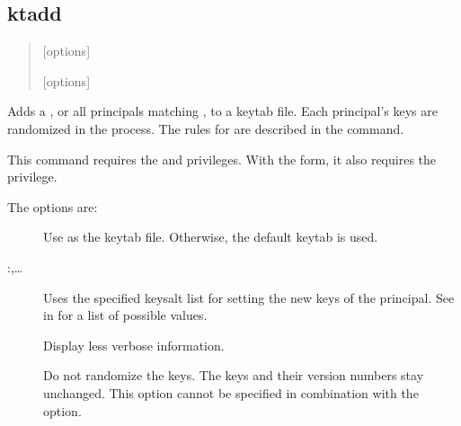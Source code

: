 \documentclass[letterpaper,10pt,english]{sphinxmanual}
\begin{document}
\subsection{ktadd}
\label{\detokenize{admin/appl_servers:ktadd}}\begin{quote}

\begin{DUlineblock}{0em}
\item[]  {[}options{]} 
\item[]  {[}options{]}  
\end{DUlineblock}
\end{quote}

Adds a , or all principals matching , to a
keytab file.  Each principal’s keys are randomized in the process.
The rules for  are described in the 
command.

This command requires the  and  privileges.
With the  form, it also requires the  privilege.

The options are:
\begin{description}
\item[{ }] \leavevmode
Use  as the keytab file.  Otherwise, the default keytab is
used.

\item[{ :,…}] \leavevmode
Uses the specified keysalt list for setting the new keys of the
principal.  See {\hyperref[\detokenize{admin/conf_files/kdc_conf:keysalt-lists}]{}} in {\hyperref[\detokenize{admin/conf_files/kdc_conf:kdc-conf-5}]{}} for a
list of possible values.

\item[{}] \leavevmode
Display less verbose information.

\item[{}] \leavevmode
Do not randomize the keys. The keys and their version numbers stay
unchanged.  This option cannot be specified in combination with the
 option.

\end{description}
\end{document}
